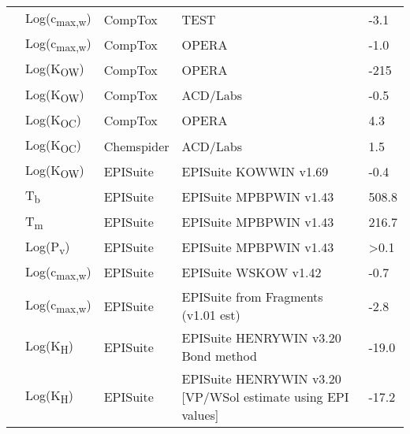 \begin{landscape}
\begin{longtable}[c]{lllll}
          & Log(c\textsubscript{max,w}) & CompTox    & TEST                                                                            & -3.1  \\
          & Log(c\textsubscript{max,w}) & CompTox    & OPERA                                                                           & -1.0  \\
          & Log(K\textsubscript{OW})      & CompTox    & OPERA                                                                           & -215  \\
          & Log(K\textsubscript{OW})      & CompTox    & ACD/Labs                                                                        & -0.5  \\
          & Log(K\textsubscript{OC})      & CompTox    & OPERA                                                                           & 4.3   \\
          & Log(K\textsubscript{OC})      & Chemspider & ACD/Labs                                                                        & 1.5   \\
          & Log(K\textsubscript{OW})      & EPISuite   & EPISuite KOWWIN v1.69                                                           & -0.4  \\
          & T\textsubscript{b}          & EPISuite   & EPISuite MPBPWIN v1.43                                                          & 508.8 \\
          & T\textsubscript{m}          & EPISuite   & EPISuite MPBPWIN v1.43                                                          & 216.7 \\
          & Log(P\textsubscript{v})       & EPISuite   & EPISuite MPBPWIN v1.43                                                          & >0.1  \\
          & Log(c\textsubscript{max,w}) & EPISuite   & EPISuite WSKOW v1.42                                                            & -0.7  \\
          & Log(c\textsubscript{max,w}) & EPISuite   & EPISuite from Fragments (v1.01 est)                                             & -2.8  \\
          & Log(K\textsubscript{H})       & EPISuite   & EPISuite HENRYWIN v3.20 Bond method                                             & -19.0 \\
          & Log(K\textsubscript{H})       & EPISuite   & EPISuite HENRYWIN v3.20 [VP/WSol estimate using EPI values]                     & -17.2 \\

\end{longtable}
\end{landscape}
